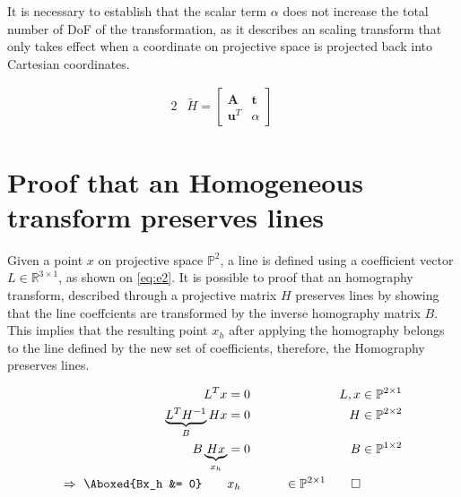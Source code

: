 \documentclass{article}
\begin{document}
It is necessary to establish that the scalar term $\alpha$ does not increase the total number of DoF of the transformation, as it describes an scaling transform that only takes effect when a coordinate on projective space is projected back into Cartesian coordinates.

\begin{alignat}{2}
&\tilde{H} = \begin{bmatrix}
\mathbf{A} & \mathbf{t} \\
\mathbf{u}^{T} & \alpha
\end{bmatrix} & \quad   \label{eq:e1}
\end{alignat}

\section{Proof that an Homogeneous transform preserves lines}
Given a point $x$ on projective space $\mathbb{P}^2$, a line is defined using a coefficient vector $L \in \mathbb{R}^{3 \times 1}$, as shown on \eqref{eq:e2}. It is possible to proof that an homography transform, described through a projective matrix $H$ preserves lines by showing that the line coeffcients are transformed by the inverse homography matrix $B$. This implies that the resulting point $x_{h}$ after applying the homography belongs to the line defined by the new set of coefficients, therefore, the Homography preserves lines.

\begin{alignat}{3}
L^{T}x &= 0 \qquad &L, x &\in \mathbb{P}^{2 \times 1} \label{eq:e2} \\
\nonumber
\underbrace{L^{T}H^{-1}}_{B}Hx &= 0 \qquad &H &\in \mathbb{P}^{2 \times 2} \\
\nonumber
B\underbrace{Hx}_{x_h} &= 0 \qquad &B &\in \mathbb{P}^{1 \times 2} \\
\Rightarrow~ \Aboxed{Bx_h &= 0} \qquad &x_h &\in \mathbb{P}^{2 \times 1} \qed \label{eq:e3}
\end{alignat}




\end{document}
